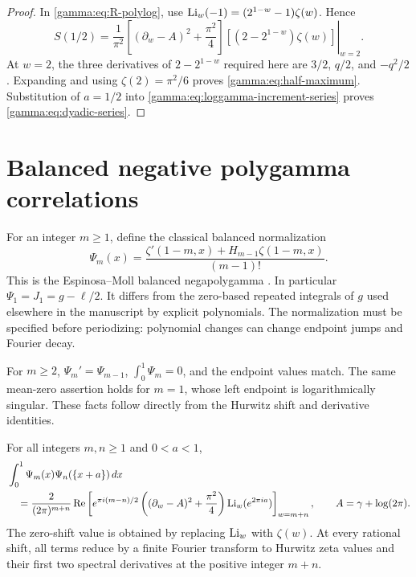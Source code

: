 \begin{proof}
In \eqref{gamma:eq:R-polylog}, use
$\operatorname{Li}_w(-1)=(2^{1-w}-1)\zeta(w)$. Hence
\[
 S(1/2)=\left.\frac1{\pi^2}
   \left[(\partial_w-A)^2+\frac{\pi^2}{4}\right]
       [(2-2^{1-w})\zeta(w)]\right|_{w=2}.
\]
At $w=2$, the three derivatives of $2-2^{1-w}$ required here are
$3/2$, $q/2$, and $-q^2/2$. Expanding and using $\zeta(2)=\pi^2/6$
proves \eqref{gamma:eq:half-maximum}. Substitution of $a=1/2$ into
\eqref{gamma:eq:loggamma-increment-series} proves
\eqref{gamma:eq:dyadic-series}.
\end{proof}

\section{Balanced negative polygamma correlations}
\label{gamma:sec:negative-polygamma}

For an integer $m\ge1$, define the classical balanced normalization
\begin{equation}
 \Psi_m(x)=\frac{\zeta'(1-m,x)+H_{m-1}\zeta(1-m,x)}{(m-1)!}.
 \label{gamma:eq:balanced}
\end{equation}
This is the Espinosa--Moll balanced negapolygamma
\cite{gamma:EspinosaMoll2004}. In particular
$\Psi_1=J_1=g-\ell/2$. It differs from the zero-based repeated
integrals of $g$ used elsewhere in the manuscript by explicit
polynomials. The normalization must be specified before periodizing:
polynomial changes can change endpoint jumps and Fourier decay.

For $m\ge2$, $\Psi_m'=\Psi_{m-1}$,
$\int_0^1\Psi_m=0$, and the endpoint values match.
The same mean-zero assertion holds for $m=1$, whose left endpoint is
logarithmically singular. These facts follow directly from the Hurwitz
shift and derivative identities.

\begin{theorem}
\label{gamma:thm:balanced-correlation}
For all integers $m,n\ge1$ and $0<a<1$,
\begin{equation}
 \begin{split}
 &\int_0^1\Psi_m(x)\Psi_n(\{x+a\})\,dx\\
 &\quad=\frac2{(2\pi)^{m+n}}
 \operatorname{Re}\left[
    e^{\pi i(m-n)/2}
    \left((\partial_w-A)^2+\frac{\pi^2}{4}\right)
    \operatorname{Li}_w(e^{2\pi ia})\right]_{w=m+n},
 \qquad A=\gamma+\log(2\pi).
 \end{split}
 \label{gamma:eq:balanced-correlation}
\end{equation}
The zero-shift value is obtained by replacing $\operatorname{Li}_w$ with $\zeta(w)$.
At every rational shift, all terms reduce by a finite Fourier transform
to Hurwitz zeta values and their first two spectral derivatives at the
positive integer $m+n$.
\end{theorem}


